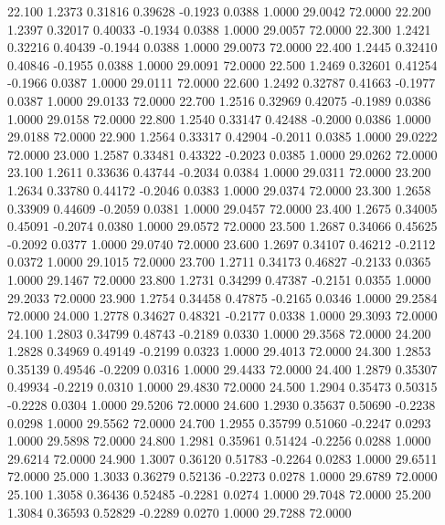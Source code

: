   22.100   1.2373   0.31816   0.39628  -0.1923   0.0388   1.0000  29.0042  72.0000
  22.200   1.2397   0.32017   0.40033  -0.1934   0.0388   1.0000  29.0057  72.0000
  22.300   1.2421   0.32216   0.40439  -0.1944   0.0388   1.0000  29.0073  72.0000
  22.400   1.2445   0.32410   0.40846  -0.1955   0.0388   1.0000  29.0091  72.0000
  22.500   1.2469   0.32601   0.41254  -0.1966   0.0387   1.0000  29.0111  72.0000
  22.600   1.2492   0.32787   0.41663  -0.1977   0.0387   1.0000  29.0133  72.0000
  22.700   1.2516   0.32969   0.42075  -0.1989   0.0386   1.0000  29.0158  72.0000
  22.800   1.2540   0.33147   0.42488  -0.2000   0.0386   1.0000  29.0188  72.0000
  22.900   1.2564   0.33317   0.42904  -0.2011   0.0385   1.0000  29.0222  72.0000
  23.000   1.2587   0.33481   0.43322  -0.2023   0.0385   1.0000  29.0262  72.0000
  23.100   1.2611   0.33636   0.43744  -0.2034   0.0384   1.0000  29.0311  72.0000
  23.200   1.2634   0.33780   0.44172  -0.2046   0.0383   1.0000  29.0374  72.0000
  23.300   1.2658   0.33909   0.44609  -0.2059   0.0381   1.0000  29.0457  72.0000
  23.400   1.2675   0.34005   0.45091  -0.2074   0.0380   1.0000  29.0572  72.0000
  23.500   1.2687   0.34066   0.45625  -0.2092   0.0377   1.0000  29.0740  72.0000
  23.600   1.2697   0.34107   0.46212  -0.2112   0.0372   1.0000  29.1015  72.0000
  23.700   1.2711   0.34173   0.46827  -0.2133   0.0365   1.0000  29.1467  72.0000
  23.800   1.2731   0.34299   0.47387  -0.2151   0.0355   1.0000  29.2033  72.0000
  23.900   1.2754   0.34458   0.47875  -0.2165   0.0346   1.0000  29.2584  72.0000
  24.000   1.2778   0.34627   0.48321  -0.2177   0.0338   1.0000  29.3093  72.0000
  24.100   1.2803   0.34799   0.48743  -0.2189   0.0330   1.0000  29.3568  72.0000
  24.200   1.2828   0.34969   0.49149  -0.2199   0.0323   1.0000  29.4013  72.0000
  24.300   1.2853   0.35139   0.49546  -0.2209   0.0316   1.0000  29.4433  72.0000
  24.400   1.2879   0.35307   0.49934  -0.2219   0.0310   1.0000  29.4830  72.0000
  24.500   1.2904   0.35473   0.50315  -0.2228   0.0304   1.0000  29.5206  72.0000
  24.600   1.2930   0.35637   0.50690  -0.2238   0.0298   1.0000  29.5562  72.0000
  24.700   1.2955   0.35799   0.51060  -0.2247   0.0293   1.0000  29.5898  72.0000
  24.800   1.2981   0.35961   0.51424  -0.2256   0.0288   1.0000  29.6214  72.0000
  24.900   1.3007   0.36120   0.51783  -0.2264   0.0283   1.0000  29.6511  72.0000
  25.000   1.3033   0.36279   0.52136  -0.2273   0.0278   1.0000  29.6789  72.0000
  25.100   1.3058   0.36436   0.52485  -0.2281   0.0274   1.0000  29.7048  72.0000
  25.200   1.3084   0.36593   0.52829  -0.2289   0.0270   1.0000  29.7288  72.0000
